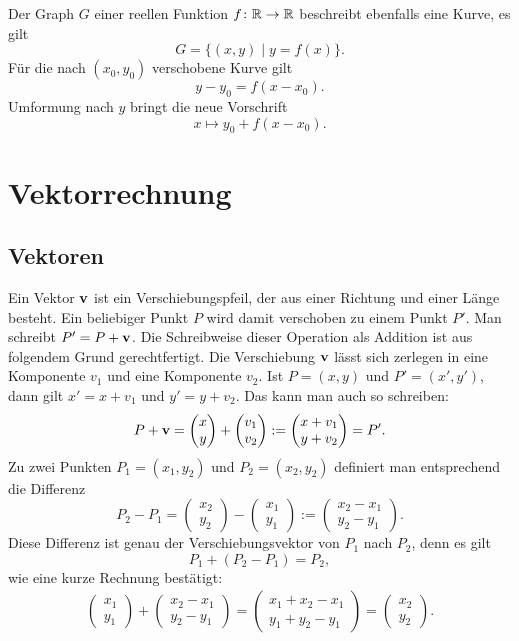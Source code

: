 Der Graph $G$ einer reellen Funktion $f\colon\mathbb R\to\mathbb R$ beschreibt
ebenfalls eine Kurve, es gilt
\[G = \{(x,y)\mid y=f(x)\}.\]
Für die nach $(x_0,y_0)$ verschobene Kurve gilt
\[y-y_0 = f(x-x_0).\]
Umformung nach $y$ bringt die neue Vorschrift
\[x\mapsto y_0+f(x-x_0).\]

\section{Vektorrechnung}

\subsection{Vektoren}

Ein Vektor $\mathbf{v}$ ist ein Verschiebungspfeil, der aus einer
Richtung und einer Länge besteht. Ein beliebiger Punkt $P$ wird damit
verschoben zu einem Punkt $P'$. Man schreibt $P' = P+\mathbf{v}$. Die
Schreibweise dieser Operation als Addition ist aus folgendem Grund
gerechtfertigt. Die Verschiebung $\mathbf{v}$ lässt sich zerlegen in
eine Komponente $v_1$ und eine Komponente $v_2$. Ist
$P=(x,y)$ und $P'=(x',y')$, dann gilt $x'=x+v_1$ und $y'=y+v_2$.
Das kann man auch so schreiben:%
\[P+\mathbf{v} = \begin{pmatrix}x\\ y\end{pmatrix}
+\begin{pmatrix}v_1\\ v_2\end{pmatrix}
:= \begin{pmatrix}x+v_1\\ y+v_2\end{pmatrix} = P'.\]
Zu zwei Punkten $P_1=(x_1,y_2)$ und $P_2=(x_2,y_2)$ definiert man
entsprechend die Differenz
\[P_2-P_1 = \begin{pmatrix}x_2\\ y_2\end{pmatrix}
-\begin{pmatrix}x_1\\ y_1\end{pmatrix}
:= \begin{pmatrix}x_2-x_1\\ y_2-y_1\end{pmatrix}.\]
Diese Differenz ist genau der Verschiebungsvektor von $P_1$ nach
$P_2$, denn es gilt
\[P_1+(P_2-P_1) = P_2,\]
wie eine kurze Rechnung bestätigt:
\begin{gather*}
\begin{pmatrix}
x_1\\ y_1
\end{pmatrix}
+ \begin{pmatrix}
x_2-x_1\\
y_2-y_1
\end{pmatrix}
= \begin{pmatrix}
x_1+x_2-x_1\\
y_1+y_2-y_1
\end{pmatrix}
= \begin{pmatrix}
x_2\\
y_2
\end{pmatrix}.
\end{gather*}
